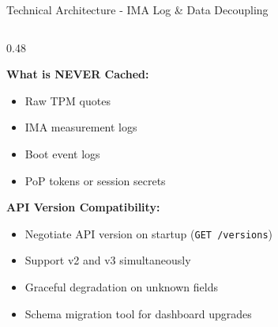 \begin{frame}{Technical Architecture - IMA Log \& Data Decoupling}
\begin{columns}[T]
\begin{column}{0.48\textwidth}
      \vspace{0.1cm}

      \textbf{What is NEVER Cached:}
      \begin{itemize}
        \setlength{\itemsep}{0pt}
        \item Raw TPM quotes
        \item IMA measurement logs
        \item Boot event logs
        \item PoP tokens or session secrets
      \end{itemize}

      \vspace{0.1cm}

      \textbf{API Version Compatibility:}
      \begin{itemize}
        \setlength{\itemsep}{0pt}
        \item Negotiate API version on startup (\texttt{GET /versions})
        \item Support v2 and v3 simultaneously
        \item Graceful degradation on unknown fields
        \item Schema migration tool for dashboard upgrades
      \end{itemize}
    \end{column}
  \end{columns}
\end{frame}

